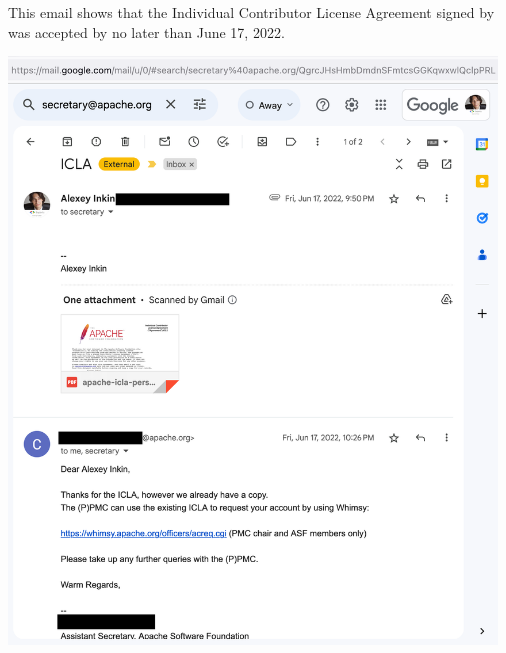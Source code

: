 
This email shows that the Individual Contributor License Agreement signed by \mrl {}
was accepted by \Asf no later than June 17, 2022.

\begin{center}
    \includegraphics[width=35em]{icla-accepted_public}
\end{center}

\pagebreak
